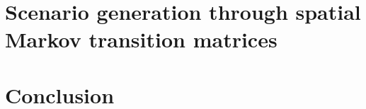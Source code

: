 \documentclass[11pt]{article}
\begin{document}
\section{Scenario generation through spatial Markov transition matrices}
\label{sec:scen}


%

\section{Conclusion} \label{conclusion}






\end{document}
